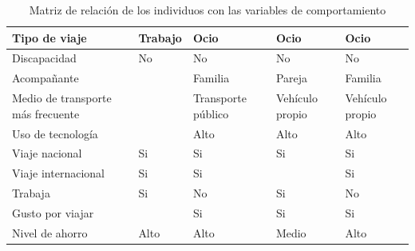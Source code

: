 \begin{table}[H]
\begin{tabular}{|p{10em}|p{7em}|p{7em}|p{7em}|p{8em}|}
        Tipo de viaje                     & Trabajo                                     & Ocio                                          & Ocio                                          & Ocio                                          \\ \hline
        Discapacidad                      & No                                          & No                                            & No                                            & No                                            \\ \hline
        Acompañante                       &                                             & Familia                                       & Pareja                                        & Familia                                       \\ \hline
        Medio de transporte más frecuente &                                             & Transporte público                            & Vehículo propio                               & Vehículo propio                               \\ \hline
        Uso de tecnología                 &                                             & Alto                                          & Alto                                          & Alto                                          \\ \hline
        Viaje nacional                    & Si                                          & Si                                            & Si                                            & Si                                            \\ \hline
        Viaje internacional               & Si                                          & Si                                            &                                               & Si                                            \\ \hline
        Trabaja                           & Si                                          & No                                            & Si                                            & No                                            \\ \hline
        Gusto por viajar                  &                                             & Si                                            & Si                                            & Si                                            \\ \hline
        Nivel de ahorro                   & Alto                                        & Alto                                          & Medio                                         & Alto                                          \\ \hline
    \end{tabular}
    \caption{Matriz de relación de los individuos con las variables de comportamiento}
    \label{table:relacion-individuos-variables}
\end{table}

